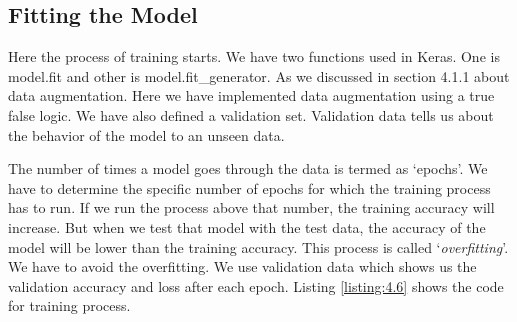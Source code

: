 \subsection{Fitting the Model}
Here the process of training starts. We have two functions used in Keras. One
is model.fit and other is model.fit\_generator. As we discussed in section 4.1.1
about data augmentation. Here we have implemented data augmentation using a true false
logic. We have also defined a validation set. Validation data tells us about the
behavior of the model to an unseen data.

The number of times a model goes through the data is termed as `epochs'.
We have to determine the specific number of epochs for which the training process has to
run. If we run the process above that number, the training accuracy will
increase. But when we test that model with the test data, the accuracy of the model
will be lower than the training accuracy. This process is called `\textit{overfitting}'.
We have to avoid the overfitting. We use validation data which shows us the validation accuracy
and loss after each epoch. Listing \ref{listing:4.6} shows the code for training process.

